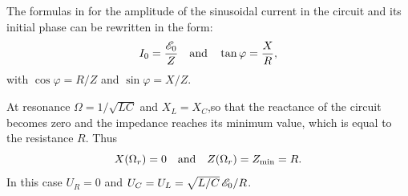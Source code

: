 The formulas in  for the amplitude of the sinusoidal current in the circuit and its initial phase can be rewritten in the form: 
\begin{equation*}%
I_{0} = \frac{\emf_{0}}{Z} \qand \tan \varphi = \frac{X}{R},
\end{equation*}
with $\cos \varphi = R/Z$ and $\sin \varphi = X/Z$. 

At resonance $\Omega = 1/\sqrt{LC}$ and $X_{L} = X_{C}$,so that the reactance of the circuit becomes zero and the impedance reaches its minimum value, which is equal to the resistance $R$. Thus
\begin{equation*}%
X (\Omega_{r}) = 0 \qand Z (\Omega_{r}) = Z_{\text{min}} = R.
\end{equation*}
In this case $U_{R} = 0$ and $U_{C} = U_{L} = \sqrt{L/C}\, \mathscr{E}_{0}/R$.

